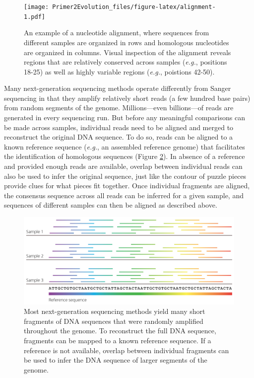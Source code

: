 \documentclass[
]{book}
\begin{document}
\begin{figure}
\centering
\texttt{[image: Primer2Evolution\_files/figure-latex/alignment-1.pdf]}
\caption{\label{fig:alignment}An example of a nucleotide alignment, where sequences from different samples are organized in rows and homologous nucleotides are organized in columns. Visual inspection of the alignment reveals regions that are relatively conserved across samples (\emph{e.g.}, positions 18-25) as well as highly variable regions (\emph{e.g.}, poistions 42-50).}
\end{figure}

Many next-generation sequencing methods operate differently from Sanger sequencing in that they amplify relatively short reads (a few hundred base pairs) from random segments of the genome. Millions---even billions---of reads are generated in every sequencing run. But before any meaningful comparisons can be made across samples, individual reads need to be aligned and merged to reconstruct the original DNA sequence. To do so, reads can be aligned to a known reference sequence (\emph{e.g.}, an assembled reference genome) that facilitates the identification of homologous sequences (Figure \ref{fig:assembly}). In absence of a reference and provided enough reads are available, overlap between individual reads can also be used to infer the original sequence, just like the contour of puzzle pieces provide clues for what pieces fit together. Once individual fragments are aligned, the consensus sequence across all reads can be inferred for a given sample, and sequences of different samples can then be aligned as described above.

\begin{figure}
\includegraphics[width=1\linewidth]{images/assembly} \caption{Most next-generation sequencing methods yield many short fragments of DNA sequences that were randomly amplified throughout the genome. To reconstruct the full DNA sequence, fragments can be mapped to a known reference sequence. If a reference is not available, overlap between individual fragments can be used to infer the DNA sequence of larger segments of the genome.}\label{fig:assembly}
\end{figure}
\end{document}
